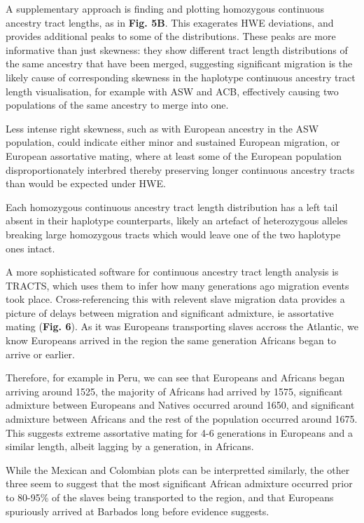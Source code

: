 \documentclass[11pt]{article}
\begin{document}
A supplementary approach is finding and plotting homozygous continuous ancestry tract lengths, as in \textbf{Fig. 5B}. This exagerates HWE deviations, and provides additional peaks to some of the distributions. These peaks are more informative than just skewness: they show different tract length distributions of the same ancestry that have been merged, suggesting significant migration is the likely cause of corresponding skewness in the haplotype continuous ancestry tract length visualisation, for example with ASW and ACB, effectively causing two populations of the same ancestry to merge into one.

Less intense right skewness, such as with European ancestry in the ASW population, could indicate either minor and sustained European migration, or European assortative mating, where at least some of the European population disproportionately interbred thereby preserving longer continuous ancestry tracts than would be expected under HWE.

Each homozygous continuous ancestry tract length distribution has a left tail absent in their haplotype counterparts, likely an artefact of heterozygous alleles breaking large homozygous tracts which would leave one of the two haplotype ones intact.

A more sophisticated software for continuous ancestry tract length analysis is TRACTS, which uses them to infer how many generations ago migration events took place. Cross-referencing this with relevent slave migration data provides a picture of delays between migration and significant admixture, ie assortative mating (\textbf{Fig. 6}). As it was Europeans transporting slaves accross the Atlantic, we know Europeans arrived in the region the same generation Africans began to arrive or earlier.

Therefore, for example in Peru, we can see that Europeans and Africans began arriving around 1525, the majority of Africans had arrived by 1575, significant admixture between Europeans and Natives occurred around 1650, and significant admixture between Africans and the rest of the population occurred around 1675. This suggests extreme assortative mating for 4-6 generations in Europeans and a similar length, albeit lagging by a generation, in Africans.

While the Mexican and Colombian plots can be interpretted similarly, the other three seem to suggest that the most significant African admixture occurred prior to 80-95\% of the slaves being transported to the region, and that Europeans spuriously arrived at Barbados long before evidence suggests. 
\end{document}
